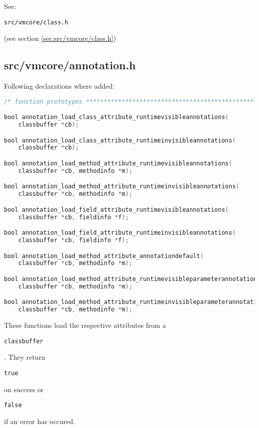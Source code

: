 \documentclass[a4paper, 10pt, titlepage]{scrartcl} %
\begin{document}
See: \begin{scriptsize}\verb|src|\hspace{0.0pt}\verb|/|\hspace{0.0pt}\verb|vmcore|\hspace{0.0pt}\verb|/|\hspace{0.0pt}\verb|class|\hspace{0.0pt}\verb|.|\hspace{0.0pt}\verb|h|\end{scriptsize} (see section \ref{sec:src/vmcore/class.h})

\subsection{src/vmcore/annotation.h}
\label{sec:src/vmcore/annotation.h}

Following declarations where added:
\begin{lstlisting}[language=C,firstnumber=43]
/* function prototypes ********************************************************/

bool annotation_load_class_attribute_runtimevisibleannotations(
	classbuffer *cb);

bool annotation_load_class_attribute_runtimeinvisibleannotations(
	classbuffer *cb);

bool annotation_load_method_attribute_runtimevisibleannotations(
	classbuffer *cb, methodinfo *m);

bool annotation_load_method_attribute_runtimeinvisibleannotations(
	classbuffer *cb, methodinfo *m);

bool annotation_load_field_attribute_runtimevisibleannotations(
	classbuffer *cb, fieldinfo *f);

bool annotation_load_field_attribute_runtimeinvisibleannotations(
	classbuffer *cb, fieldinfo *f);

bool annotation_load_method_attribute_annotationdefault(
	classbuffer *cb, methodinfo *m);

bool annotation_load_method_attribute_runtimevisibleparameterannotations(
	classbuffer *cb, methodinfo *m);

bool annotation_load_method_attribute_runtimeinvisibleparameterannotations(
	classbuffer *cb, methodinfo *m);
\end{lstlisting}

These functions load the respective attributes from a \begin{scriptsize}\verb|classbuffer|\end{scriptsize}.
They return \begin{scriptsize}\verb|true|\end{scriptsize} on success or \begin{scriptsize}\verb|false|\end{scriptsize} if an error has occured.
\end{document}
